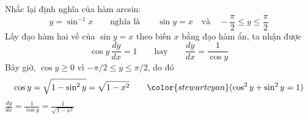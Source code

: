 \begin{minipage}[t]{0.69\textwidth}
  Nhắc lại định nghĩa của hàm arcsin:
  \[
    y = \sin^{-1} x \qquad \text{nghĩa là} \qquad \sin y = x \quad \text{và} \quad -\frac{\pi}{2} \le y \le \frac{\pi}{2}
  \]
  Lấy đạo hàm hai vế của $\sin y = x$ theo biến $x$ bằng đạo hàm ẩn, ta nhận được
  \[
    \cos y \, \frac{dy}{dx} = 1 \qquad \text{hay} \qquad \frac{dy}{dx} = \frac{1}{\cos y}
  \]
  Bây giờ, $\cos y \ge 0$ vì $-\pi/2 \le y \le \pi/2$, do đó
  \[
    \cos y = \sqrt{1 - \sin^2 y} = \sqrt{1 - x^2} \qquad {\color{stewartcyan}(\cos^2 y + \sin^2 y = 1)}
  \]
  \noindent
  \hfill $\displaystyle\frac{dy}{dx} = \frac{1}{\cos y} = \frac{1}{\sqrt{1 - x^2}}$\hfill\null

  \vspace{5pt}
  \begin{center}
  \end{center}
\end{minipage}
